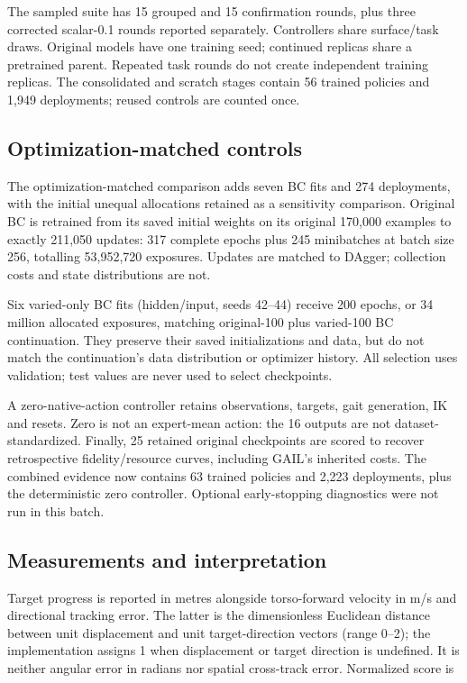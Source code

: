 \documentclass[conference]{IEEEtran}
\begin{document}
The sampled suite has 15 grouped and 15 confirmation rounds, plus three corrected scalar-0.1 rounds reported separately. Controllers share surface/task draws. Original models have one training seed; continued replicas share a pretrained parent. Repeated task rounds do not create independent training replicas. The consolidated and scratch stages contain 56 trained policies and 1,949 deployments; reused controls are counted once.

\subsection{Optimization-matched controls}

The optimization-matched comparison adds seven BC fits and 274 deployments, with the initial unequal allocations retained as a sensitivity comparison. Original BC is retrained from its saved initial weights on its original 170,000 examples to exactly 211,050 updates: 317 complete epochs plus 245 minibatches at batch size 256, totalling 53,952,720 exposures. Updates are matched to DAgger; collection costs and state distributions are not.

Six varied-only BC fits (hidden/input, seeds 42--44) receive 200 epochs, or 34 million allocated exposures, matching original-100 plus varied-100 BC continuation. They preserve their saved initializations and data, but do not match the continuation's data distribution or optimizer history. All selection uses validation; test values are never used to select checkpoints.

A zero-native-action controller retains observations, targets, gait generation, IK and resets. Zero is not an expert-mean action: the 16 outputs are not dataset-standardized. Finally, 25 retained original checkpoints are scored to recover retrospective fidelity/resource curves, including GAIL's inherited costs. The combined evidence now contains 63 trained policies and 2,223 deployments, plus the deterministic zero controller. Optional early-stopping diagnostics were not run in this batch.

\subsection{Measurements and interpretation}

Target progress is reported in metres alongside torso-forward velocity in m/s and directional tracking error. The latter is the dimensionless Euclidean distance between unit displacement and unit target-direction vectors (range 0--2); the implementation assigns 1 when displacement or target direction is undefined. It is neither angular error in radians nor spatial cross-track error. Normalized score is
\end{document}
